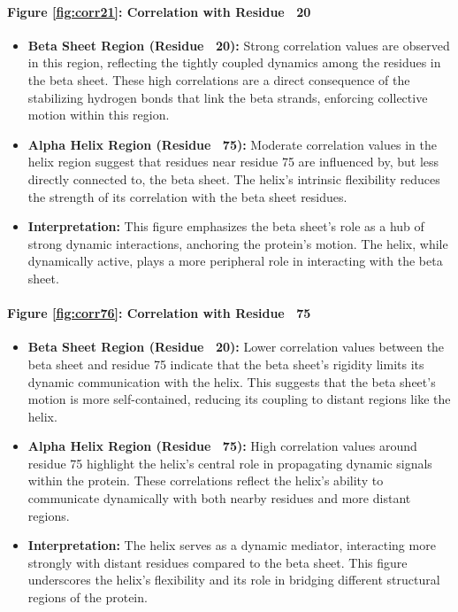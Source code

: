 \documentclass[English, Lau, oneside]{sapthesis}
\begin{document}
\paragraph{Figure \ref{fig:corr21}: Correlation with Residue ~20}

\begin{itemize}
    \item \textbf{Beta Sheet Region (Residue ~20):} Strong correlation values are observed in this region, reflecting the tightly coupled dynamics among the residues in the beta sheet. These high correlations are a direct consequence of the stabilizing hydrogen bonds that link the beta strands, enforcing collective motion within this region.
    \item \textbf{Alpha Helix Region (Residue ~75):} Moderate correlation values in the helix region suggest that residues near residue 75 are influenced by, but less directly connected to, the beta sheet. The helix's intrinsic flexibility reduces the strength of its correlation with the beta sheet residues.
    \item \textbf{Interpretation:} This figure emphasizes the beta sheet's role as a hub of strong dynamic interactions, anchoring the protein’s motion. The helix, while dynamically active, plays a more peripheral role in interacting with the beta sheet.
\end{itemize}

\paragraph{Figure \ref{fig:corr76}: Correlation with Residue ~75}
\begin{itemize}
    \item \textbf{Beta Sheet Region (Residue ~20):} Lower correlation values between the beta sheet and residue 75 indicate that the beta sheet's rigidity limits its dynamic communication with the helix. This suggests that the beta sheet’s motion is more self-contained, reducing its coupling to distant regions like the helix.
    \item \textbf{Alpha Helix Region (Residue ~75):} High correlation values around residue 75 highlight the helix's central role in propagating dynamic signals within the protein. These correlations reflect the helix’s ability to communicate dynamically with both nearby residues and more distant regions.
    \item \textbf{Interpretation:} The helix serves as a dynamic mediator, interacting more strongly with distant residues compared to the beta sheet. This figure underscores the helix’s flexibility and its role in bridging different structural regions of the protein.
\end{itemize}
\end{document}
